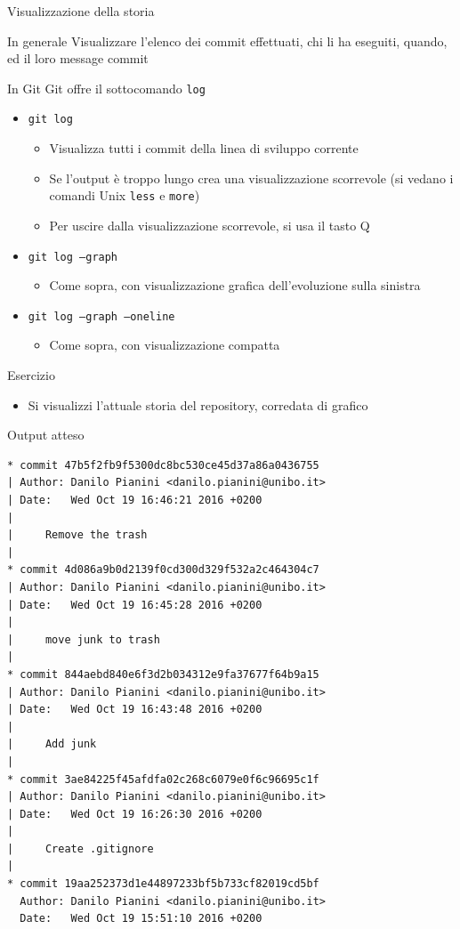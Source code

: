 \documentclass[xcolor=dvipsnames,presentation]{beamer}
\begin{document}
\begin{frame}{Visualizzazione della storia}
    \begin{block}{In generale}
        Visualizzare l'elenco dei commit effettuati, chi li ha eseguiti, quando, ed il loro message
commit
    \end{block}
    \begin{block}{In Git}
        Git offre il sottocomando \texttt{log}
        \begin{itemize}
            \item \texttt{git log}
            \begin{itemize}
                \item Visualizza tutti i commit della linea di sviluppo corrente
                \item Se l'output è troppo lungo crea una visualizzazione scorrevole (si vedano i
comandi Unix \texttt{less} e \texttt{more})
                \item Per uscire dalla visualizzazione scorrevole, si usa il tasto Q
            \end{itemize}
            \item \texttt{git log --graph}
            \begin{itemize}
                \item Come sopra, con visualizzazione grafica dell'evoluzione sulla sinistra
            \end{itemize}
            \item \texttt{git log --graph --oneline}
            \begin{itemize}
                \item Come sopra, con visualizzazione compatta
            \end{itemize}
        \end{itemize}
    \end{block}
    \begin{block}{Esercizio}
        \begin{itemize}
            \item Si visualizzi l'attuale storia del repository, corredata di grafico
        \end{itemize}
    \end{block}
    \begin{block}{Output atteso}
        \begin{Verbatim}[fontsize=\tiny]
* commit 47b5f2fb9f5300dc8bc530ce45d37a86a0436755
| Author: Danilo Pianini <danilo.pianini@unibo.it>
| Date:   Wed Oct 19 16:46:21 2016 +0200
|
|     Remove the trash
|
* commit 4d086a9b0d2139f0cd300d329f532a2c464304c7
| Author: Danilo Pianini <danilo.pianini@unibo.it>
| Date:   Wed Oct 19 16:45:28 2016 +0200
|
|     move junk to trash
|
* commit 844aebd840e6f3d2b034312e9fa37677f64b9a15
| Author: Danilo Pianini <danilo.pianini@unibo.it>
| Date:   Wed Oct 19 16:43:48 2016 +0200
|
|     Add junk
|
* commit 3ae84225f45afdfa02c268c6079e0f6c96695c1f
| Author: Danilo Pianini <danilo.pianini@unibo.it>
| Date:   Wed Oct 19 16:26:30 2016 +0200
|
|     Create .gitignore
|
* commit 19aa252373d1e44897233bf5b733cf82019cd5bf
  Author: Danilo Pianini <danilo.pianini@unibo.it>
  Date:   Wed Oct 19 15:51:10 2016 +0200


\end{Verbatim}
\end{block}
\end{frame}
\end{document}
